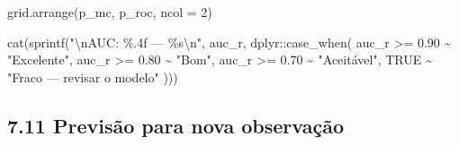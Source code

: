 \documentclass[
  letterpaper,
  DIV=11,
  numbers=noendperiod]{scrartcl}
\newenvironment{Shaded}{\begin{snugshade}}{\end{snugshade}}
\newcommand{\AttributeTok}[1]{\textcolor[rgb]{0.40,0.45,0.13}{#1}}
\newcommand{\ConstantTok}[1]{\textcolor[rgb]{0.56,0.35,0.01}{#1}}
\newcommand{\DecValTok}[1]{\textcolor[rgb]{0.68,0.00,0.00}{#1}}
\newcommand{\FloatTok}[1]{\textcolor[rgb]{0.68,0.00,0.00}{#1}}
\newcommand{\FunctionTok}[1]{\textcolor[rgb]{0.28,0.35,0.67}{#1}}
\newcommand{\NormalTok}[1]{\textcolor[rgb]{0.00,0.23,0.31}{#1}}
\newcommand{\SpecialCharTok}[1]{\textcolor[rgb]{0.37,0.37,0.37}{#1}}
\newcommand{\StringTok}[1]{\textcolor[rgb]{0.13,0.47,0.30}{#1}}
\begin{document}
\begin{Shaded}
\begin{Highlighting}[]
\FunctionTok{grid.arrange}\NormalTok{(p\_mc, p\_roc, }\AttributeTok{ncol =} \DecValTok{2}\NormalTok{)}

\FunctionTok{cat}\NormalTok{(}\FunctionTok{sprintf}\NormalTok{(}\StringTok{"}\SpecialCharTok{\textbackslash{}n}\StringTok{AUC: \%.4f — \%s}\SpecialCharTok{\textbackslash{}n}\StringTok{"}\NormalTok{, auc\_r,}
\NormalTok{    dplyr}\SpecialCharTok{::}\FunctionTok{case\_when}\NormalTok{(}
\NormalTok{      auc\_r }\SpecialCharTok{\textgreater{}=} \FloatTok{0.90} \SpecialCharTok{\textasciitilde{}} \StringTok{"Excelente"}\NormalTok{,}
\NormalTok{      auc\_r }\SpecialCharTok{\textgreater{}=} \FloatTok{0.80} \SpecialCharTok{\textasciitilde{}} \StringTok{"Bom"}\NormalTok{,}
\NormalTok{      auc\_r }\SpecialCharTok{\textgreater{}=} \FloatTok{0.70} \SpecialCharTok{\textasciitilde{}} \StringTok{"Aceitável"}\NormalTok{,}
      \ConstantTok{TRUE}          \SpecialCharTok{\textasciitilde{}} \StringTok{"Fraco — revisar o modelo"}
\NormalTok{    )))}
\end{Highlighting}
\end{Shaded}

\subsection{7.11 Previsão para nova
observação}\label{previsuxe3o-para-nova-observauxe7uxe3o}
\end{document}
